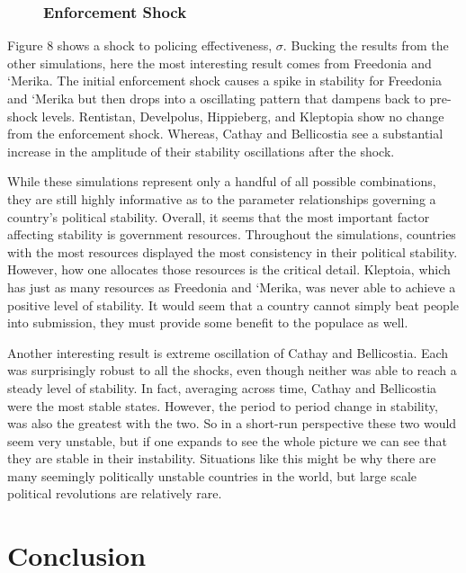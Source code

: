 \documentclass[12pt]{article}
\begin{document}
\begin{spacing}{1.5}
\begin{figure}
\subsubsection{Enforcement Shock}

\end{figure}

Figure 8 shows a shock to policing effectiveness, $\sigma$. Bucking the results from the other simulations, here the most interesting result comes from Freedonia and `Merika. The initial enforcement shock causes a spike in stability for Freedonia and `Merika but then drops into a oscillating pattern that dampens back to pre-shock levels. Rentistan, Develpolus, Hippieberg, and Kleptopia show no change from the enforcement shock. Whereas, Cathay and Bellicostia see a substantial increase in the amplitude of their stability oscillations after the shock.  


While these simulations represent only a handful of all possible combinations, they are still highly informative as to the parameter relationships governing a country's political stability. Overall, it seems that the most important factor affecting stability is government resources. Throughout the simulations, countries with the most resources displayed the most consistency in their political stability. However, how one allocates those resources is the critical detail. Kleptoia, which has just as many resources as Freedonia and `Merika, was never able to achieve a positive level of stability. It would seem that a country cannot simply beat people into submission, they must provide some benefit to the populace as well. 

Another interesting result is extreme oscillation of Cathay and Bellicostia. Each was surprisingly robust to all the shocks, even though neither was able to reach a steady level of stability. In fact, averaging across time, Cathay and Bellicostia were the most stable states. However, the period to period change in stability, was also the greatest with the two. So in a short-run perspective these two would seem very unstable, but if one expands to see the whole picture we can see that they are stable in their instability. Situations like this might be why there are many seemingly politically unstable countries in the world, but large scale political revolutions are relatively rare.   

\section{Conclusion}


\end{spacing}
\end{document}
